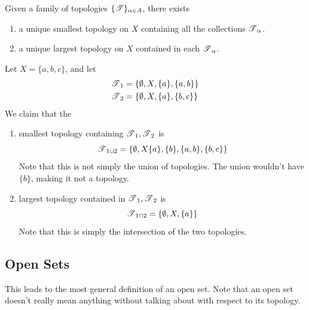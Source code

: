   \begin{corollary}
    \label{thm:unique-coarsest-and-finest-topology}
    Given a family of topologies $\{\operatorname{\mathscr{T}}\}_{\alpha \in A}$, there exists 
    \begin{enumerate}
      \item a unique smallest topology on $X$ containing all the collections $\operatorname{\mathscr{T}}_\alpha$. 
      \item a unique largest topology on $X$ contained in each $\operatorname{\mathscr{T}}_\alpha$. 
    \end{enumerate}
  \end{corollary} 

  \begin{example}
    \label{ex:smallest-topology-containing-two-topologies}
    Let $X = \{a, b, c\}$, and let 
    \begin{align}
      \operatorname{\mathscr{T}}_1 & = \{\emptyset, X, \{a\}, \{a, b\}\} \\
      \operatorname{\mathscr{T}}_2 & = \{\emptyset, X, \{a\}, \{b, c\}\}
    \end{align}
    We claim that the 
    \begin{enumerate}
      \item smallest topology containing $\operatorname{\mathscr{T}}_1, \operatorname{\mathscr{T}}_2$ is 
      \begin{equation}
        \operatorname{\mathscr{T}}_{1 \cup 2} = \{\emptyset, X \{a\}, \{b\}, \{a, b\}, \{b, c\}\}
      \end{equation} 
      Note that this is not simply the union of topologies. The union wouldn't have $\{b\}$, making it not a topology. 

      \item largest topology contained in $\operatorname{\mathscr{T}}_1, \operatorname{\mathscr{T}}_2$ is 
      \begin{equation}
        \operatorname{\mathscr{T}}_{1 \cap 2} = \{\emptyset, X, \{a\}\}
      \end{equation}
      Note that this is simply the intersection of the two topologies. 
    \end{enumerate}
  \end{example}

\subsection{Open Sets}

  This leads to the most general definition of an open set. Note that an open set doesn't really mean anything without talking about with respect to its topology. 

